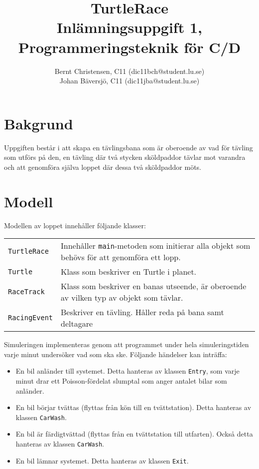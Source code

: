 \documentclass[a4paper]{article}
\title{TurtleRace \\
	Inlämningsuppgift 1, Programmeringsteknik för C/D}
\author{Bernt Christensen, C11 (dic11bch@student.lu.se)\\
Johan Bäversjö, C11 (dic11jba@student.lu.se)}
\newcommand{\code}[1]{\texttt{#1}} %
\begin{document}

\maketitle                    %
\section{Bakgrund}
Uppgiften består i att skapa en tävlingsbana som är oberoende av vad för tävling som utförs på den, en tävling där två stycken sköldpaddor tävlar mot varandra och att genomföra själva loppet där dessa två sköldpaddor möts. 

\section{Modell}
Modellen av loppet innehåller följande klasser:

\begin{tabular}{lp{8cm}}
\code{TurtleRace} & Innehåller \code{main}-metoden som initierar alla objekt som behövs för att genomföra ett lopp. \\
\code{Turtle} & Klass som beskriver en Turtle i planet. \\
\code{RaceTrack} & Klass som beskriver en banas utseende, är oberoende av vilken typ av objekt som tävlar. \\
\code{RacingEvent} & Beskriver en tävling. Håller reda på bana samt deltagare \\

\end{tabular}

\vspace{\baselineskip}
Simuleringen implementeras genom att programmet under hela simuleringstiden varje minut undersöker vad som ska ske. Följande händelser kan inträffa:

\begin{itemize}
\item En bil anländer till systemet. Detta hanteras av klassen \code{Entry}, som varje minut drar ett Poisson-fördelat slumptal som anger antalet bilar som anländer.
\item En bil börjar tvättas (flyttas från kön till en tvättstation). Detta hanteras av klassen \code{CarWash}.
\item En bil är färdigtvättad (flyttas från en tvättstation till utfarten). Också detta hanteras av klassen \code{CarWash}.
\item En bil lämnar systemet. Detta hanteras av klassen \code{Exit}.
\end{itemize}
\end{document}
